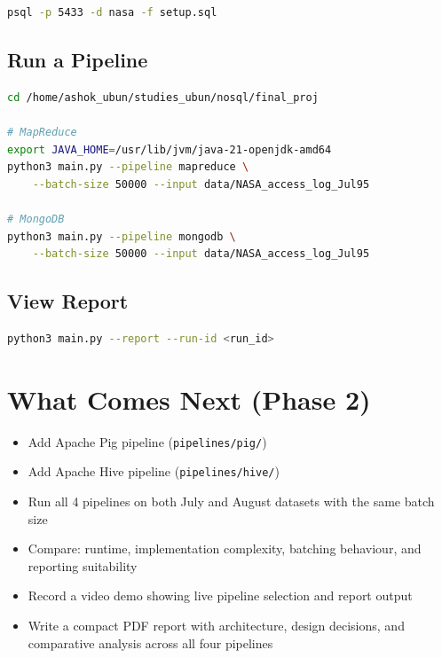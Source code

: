\documentclass[12pt,a4paper]{article}
\begin{document}
\begin{lstlisting}[language=bash]
psql -p 5433 -d nasa -f setup.sql
\end{lstlisting}

\subsection{Run a Pipeline}

\begin{lstlisting}[language=bash]
cd /home/ashok_ubun/studies_ubun/nosql/final_proj

# MapReduce
export JAVA_HOME=/usr/lib/jvm/java-21-openjdk-amd64
python3 main.py --pipeline mapreduce \
    --batch-size 50000 --input data/NASA_access_log_Jul95

# MongoDB
python3 main.py --pipeline mongodb \
    --batch-size 50000 --input data/NASA_access_log_Jul95
\end{lstlisting}

\subsection{View Report}

\begin{lstlisting}[language=bash]
python3 main.py --report --run-id <run_id>
\end{lstlisting}

\section{What Comes Next (Phase 2)}

\begin{itemize}
  \item Add Apache Pig pipeline (\texttt{pipelines/pig/})
  \item Add Apache Hive pipeline (\texttt{pipelines/hive/})
  \item Run all 4 pipelines on both July and August datasets with the same batch size
  \item Compare: runtime, implementation complexity, batching behaviour, and reporting
        suitability
  \item Record a video demo showing live pipeline selection and report output
  \item Write a compact PDF report with architecture, design decisions, and comparative
        analysis across all four pipelines
\end{itemize}
\end{document}
